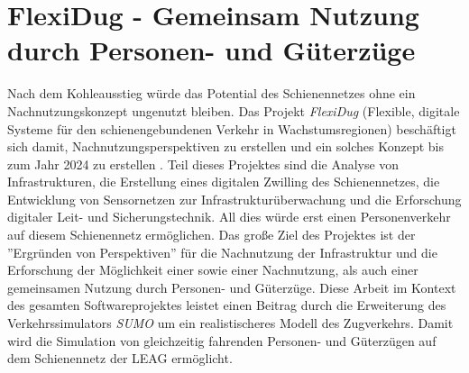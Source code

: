 \section{FlexiDug - Gemeinsam Nutzung durch Personen- und Güterzüge}

Nach dem Kohleausstieg würde das Potential des Schienennetzes ohne ein Nachnutzungskonzept ungenutzt bleiben\cite{rbb_hpi_2022}. Das Projekt \emph{FlexiDug} (Flexible, digitale Systeme für den schienengebundenen Verkehr in Wachstumsregionen) beschäftigt sich damit, Nachnutzungsperspektiven zu erstellen und ein solches Konzept bis zum Jahr 2024 zu erstellen \cite{hasso_plattner_institut_flexidug_2022}. Teil dieses Projektes sind die Analyse von Infrastrukturen, die Erstellung eines digitalen Zwilling des Schienennetzes, die Entwicklung von Sensornetzen zur Infrastrukturüberwachung und die Erforschung digitaler Leit- und Sicherungstechnik. All dies würde erst einen Personenverkehr auf diesem Schienennetz ermöglichen. Das große Ziel des Projektes ist der ''Ergründen von Perspektiven'' für die Nachnutzung der Infrastruktur und die Erforschung der Möglichkeit einer sowie einer Nachnutzung, als auch einer gemeinsamen Nutzung durch Personen- und Güterzüge.\cite{rbb_hpi_2022} Diese Arbeit im Kontext des gesamten Softwareprojektes leistet einen Beitrag durch die Erweiterung des Verkehrssimulators \emph{SUMO} um ein realistischeres Modell des Zugverkehrs. Damit wird die Simulation von gleichzeitig fahrenden Personen- und Güterzügen auf dem Schienennetz der LEAG ermöglicht.
